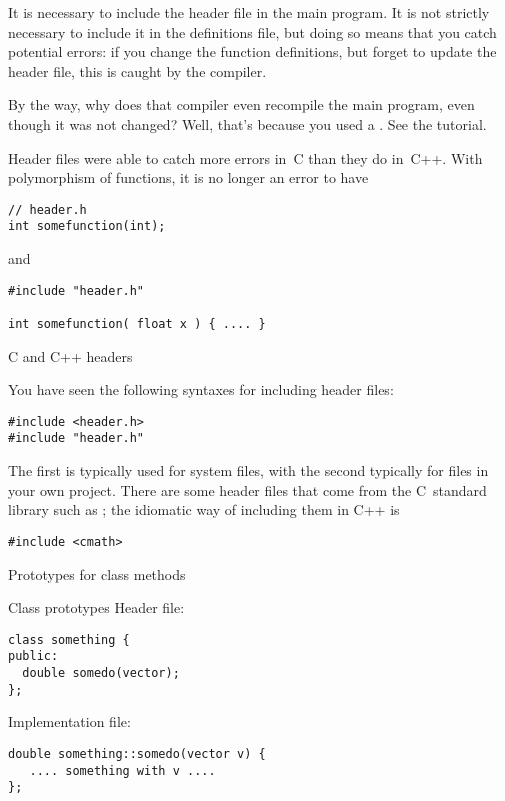 It is necessary to include the header file in the main program. It is
not strictly necessary to include it in the definitions file, but
doing so means that you catch potential errors: if you change the
function definitions, but forget to update the header file, this is
caught by the compiler.

\begin{remark}
  By the way, why does that compiler even recompile the main program,
  even though it was not changed? Well, that's because you used a
  . See the tutorial.
\end{remark}
\begin{remark}
  Header files were able to catch more errors in~C than they do
  in~C++. With polymorphism of functions, it is no longer an error to
  have 
\begin{lstlisting}
// header.h
int somefunction(int);
\end{lstlisting}
and
\begin{lstlisting}
#include "header.h"

int somefunction( float x ) { .... }
\end{lstlisting}
\end{remark}

 {C and C++ headers}

You have seen the following syntaxes for including header files:
\begin{lstlisting}
#include <header.h>
#include "header.h"
\end{lstlisting}
The first is typically used for system files, with the second
typically for files in your own project. There are some header files
that come from the C~standard library such as ; the
idiomatic way of including them in C++ is
\begin{lstlisting}
#include <cmath>
\end{lstlisting}

 {Prototypes for class methods}

\begin{block}{Class prototypes}
  \label{sl:class-proto}
  Header file:
\begin{lstlisting}
class something {
public:
  double somedo(vector);
};
\end{lstlisting}

Implementation file:
\begin{lstlisting}
double something::somedo(vector v) {
   .... something with v ....
};
\end{lstlisting}
\end{block}

